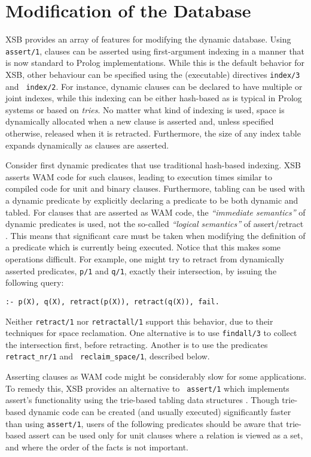 \section{Modification of the Database} \label{sec:assert}

XSB provides an array of features for modifying the dynamic database.
Using {\tt assert/1}, clauses can be asserted using first-argument
indexing in a manner that is now standard to Prolog implementations.
While this is the default behavior for XSB, other behaviour can be
specified using the (executable) directives {\tt index/3} and {\tt
index/2}.  For instance, dynamic clauses can be declared to have
multiple or joint indexes, while this indexing can be either
hash-based as is typical in Prolog systems or based on {\em tries}.
No matter what kind of indexing is used, space is dynamically
allocated when a new clause is asserted and, unless specified
otherwise, released when it is retracted.  Furthermore, the size of
any index table expands dynamically as clauses are asserted.

Consider first dynamic predicates that use traditional hash-based
indexing.  XSB asserts WAM code for such clauses, leading to execution
times similar to compiled code for unit and binary clauses.
Furthermore, tabling can be used with a dynamic predicate by
explicitly declaring a predicate to be both dynamic and tabled.  For
clauses that are asserted as WAM code, the {\em ``immediate
semantics''} of dynamic predicates is used, not the so-called {\em
``logical semantics''} of assert/retract \cite{LiOk87}. This means
that significant care must be taken when modifying the definition of a
predicate which is currently being executed. Notice that this makes
some operations difficult. For example, one might try to retract from
dynamically asserted predicates, {\tt p/1} and {\tt q/1}, exactly
their intersection, by issuing the following query:
\begin{center} 
{\tt :- p(X), q(X), retract(p(X)), retract(q(X)), fail.}
\end{center}
Neither {\tt retract/1} nor {\tt retractall/1} support this behavior,
due to their techniques for space reclamation.  One alternative is to
use {\tt findall/3} to collect the intersection first, before retracting.
Another is to use the predicates {\tt retract\_nr/1} and {\tt
reclaim\_space/1}, described below.  

Asserting clauses as WAM code might be considerably slow for some
applications.  To remedy this, XSB provides an alternative to {\tt
assert/1} which implements assert's functionality using the trie-based
tabling data structures \cite{RRSSW98}.  Though trie-based dynamic
code can be created (and usually executed) significantly faster than
using {\tt assert/1}, users of the following predicates should be
aware that trie-based assert can be used only for unit clauses where a
relation is viewed as a set, and where the order of the facts is not
important.

